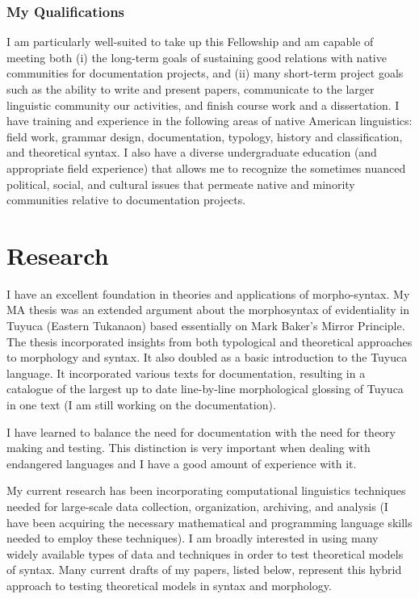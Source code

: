 \documentclass[11pt]{article}
\begin{document}
\subsubsection{My Qualifications}
I am particularly well-suited to take up this Fellowship and am capable of meeting both (i) the long-term goals of sustaining good relations with native communities for documentation projects, and (ii) many short-term project goals such as the ability to write and present papers, communicate to the larger linguistic community our activities, and finish course work and a dissertation. I have training and experience in the following areas of native American linguistics: field work, grammar design, documentation, typology, history and classification, and theoretical syntax. I also have a diverse undergraduate education (and appropriate field experience) that allows me to recognize the sometimes nuanced political, social, and cultural issues that permeate native and minority communities relative to documentation projects.

\section{Research}
I have an excellent foundation in theories and applications of morpho-syntax. My MA thesis was an extended argument about the morphosyntax of evidentiality in Tuyuca (Eastern Tukanaon) based essentially on Mark Baker's Mirror Principle. The thesis incorporated insights from both typological and theoretical approaches to morphology and syntax. It also doubled as a basic introduction to the Tuyuca language. It incorporated various texts for documentation, resulting in a catalogue of the largest up to date line-by-line morphological glossing of Tuyuca in one text (I am still working on the documentation).

I have learned to balance the need for documentation with the need for theory making and testing. This distinction is very important when dealing with endangered languages and I have a good amount of experience with it. 

My current research has been incorporating computational linguistics techniques needed for large-scale data collection, organization, archiving, and analysis (I have been acquiring the necessary mathematical and programming language skills needed to employ these techniques). I am broadly interested in using many widely available types of data and techniques in order to test theoretical models of syntax. Many current drafts of my papers, listed below, represent this hybrid approach to testing theoretical models in syntax and morphology.
\end{document}
